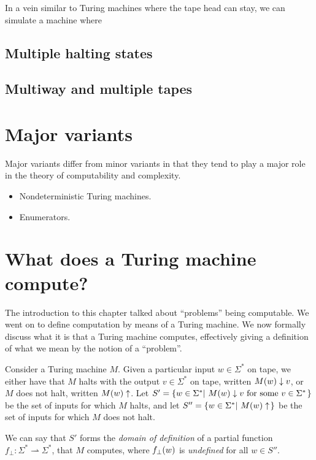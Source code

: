 In a vein similar to Turing machines where the tape head can stay, we can
simulate a machine where

\subsection{Multiple halting states}

\subsection{Multiway and multiple tapes}

\section{Major variants}

Major variants differ from minor variants in that they tend to play a major
role in the theory of computability and complexity.

\begin{itemize}

\item Nondeterministic Turing machines.

\item Enumerators.

\end{itemize}

\section{What does a Turing machine compute?}\label{sec:background-what-tm-computes}

The introduction to this chapter talked about ``problems'' being computable. We
went on to define computation by means of a Turing machine. We now formally
discuss what it is that a Turing machine computes, effectively giving a
definition of what we mean by the notion of a ``problem''.

Consider a Turing machine $M$. Given a particular input $w\in\Sigma^*$ on tape,
we either have that $M$ halts with the output $v\in\Sigma^*$ on tape, written
$M\mathopen{}\left({w}\right)\mathclose{}\downarrow v$, or $M$ does not halt, written $M\mathopen{}\left({w}\right)\mathclose{}\uparrow$.  Let
$S'=\mathopen{}\left\{{w\in\Sigma^* \mathopen{}\left|\ {\text{$M\mathopen{}\left({w}\right)\mathclose{}\downarrow v$ for some $v\in\Sigma^*$}}\right.\mathclose{}
}\right\}\mathclose{}$ be the set of inputs for which $M$ halts, and let
$S''=\mathopen{}\left\{{w\in\Sigma^*\mathopen{}\left|\ {M\mathopen{}\left({w}\right)\mathclose{}\uparrow}\right.\mathclose{}}\right\}\mathclose{}$ be the set of inputs for which $M$
does not halt.

We can say that $S'$ forms the \emph{domain of definition} of a partial
function $f_\bot : \Sigma^* \rightharpoonup \Sigma^*$, that $M$ computes, where
$f_\bot\mathopen{}\left({w}\right)\mathclose{}$ is \emph{undefined} for all $w\in S''$.

